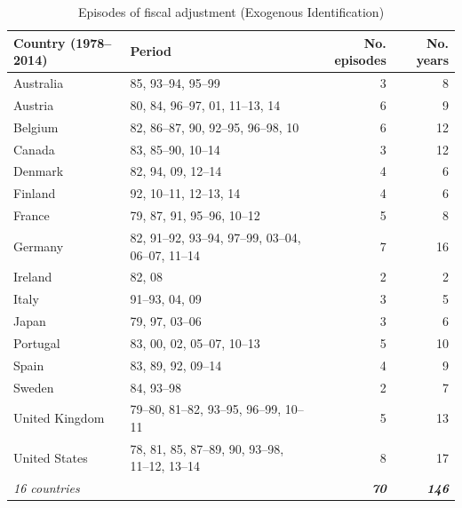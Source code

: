 \begin{table}[!htbp]
\centering
\caption{Episodes of fiscal adjustment (Exogenous Identification)}
\small
\renewcommand{\arraystretch}{1.15}
\setlength{\tabcolsep}{6pt}
\begin{tabular*}{\textwidth}{@{\extracolsep{\fill}} l l r r}
\toprule
Country (1978--2014) & Period & No. episodes & No. years \\
\midrule
Australia & 85, 93--94, 95--99 & 3 &  8 \\
Austria & 80, 84, 96--97, 01, 11--13, 14 & 6 &  9 \\
Belgium & 82, 86--87, 90, 92--95, 96--98, 10 & 6 & 12 \\
Canada & 83, 85--90, 10--14 & 3 & 12 \\
Denmark & 82, 94, 09, 12--14 & 4 &  6 \\
Finland & 92, 10--11, 12--13, 14 & 4 &  6 \\
France & 79, 87, 91, 95--96, 10--12 & 5 &  8 \\
Germany & 82, 91--92, 93--94, 97--99, 03--04, 06--07, 11--14 & 7 & 16 \\
Ireland & 82, 08 & 2 &  2 \\
Italy & 91--93, 04, 09 & 3 &  5 \\
Japan & 79, 97, 03--06 & 3 &  6 \\
Portugal & 83, 00, 02, 05--07, 10--13 & 5 & 10 \\
Spain & 83, 89, 92, 09--14 & 4 &  9 \\
Sweden & 84, 93--98 & 2 &  7 \\
United Kingdom & 79--80, 81--82, 93--95, 96--99, 10--11 & 5 & 13 \\
United States & 78, 81, 85, 87--89, 90, 93--98, 11--12, 13--14 & 8 & 17 \\
\midrule
\textit{16 countries} & \textit{} & \textit{\textbf{70}} & \textit{\textbf{146}} \\
\bottomrule
\end{tabular*}
\end{table}
